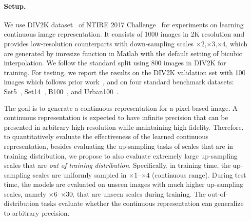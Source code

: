 \documentclass[final]{cvpr}
\begin{document}
\paragraph{Setup.}
We use DIV2K dataset~\cite{agustsson2017ntire} of NTIRE 2017 Challenge~\cite{timofte2017ntire} for experiments on learning continuous image representation. It consists of 1000 images in 2K resolution and provides low-resolution counterparts with down-sampling scales $\times2$,$\times3$,$\times4$, which are generated by imresize function in Matlab with the default setting of bicubic interpolation. We follow the standard split using 800 images in DIV2K for training. For testing, we report the results on the DIV2K validation set with 100 images which follows prior work~\cite{lim2017enhanced}, and on four standard benchmark datasets: Set5~\cite{bevilacqua2012low}, Set14~\cite{zeyde2010single}, B100~\cite{martin2001database}, and Urban100~\cite{huang2015single}.

The goal is to generate a continuous representation for a pixel-based image. A continuous representation is expected to have infinite precision that can be presented in arbitrary high resolution while maintaining high fidelity. Therefore, to quantitatively evaluate the effectiveness of the learned continuous representation, besides evaluating the up-sampling tasks of scales that are in training distribution, we propose to also evaluate extremely large up-sampling scales that are \textit{out of training distribution}. Specifically, in training time, the up-sampling scales are uniformly sampled in $\times1$--$\times4$ (continuous range). During test time, the models are evaluated on unseen images with much higher up-sampling scales, namely $\times6$--$\times30$, that are unseen scales during training. The out-of-distribution tasks evaluate whether the continuous representation can generalize to arbitrary precision.
\end{document}
